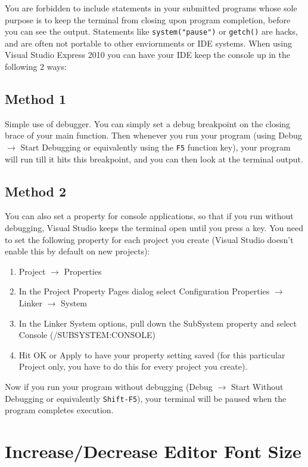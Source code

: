 \documentclass[11pt]{article}
\begin{document}
You are forbidden to include statements in your submitted programs
whose sole purpose is to keep the terminal from closing upon program
completion, before you can see the output.  Statements like
\verb~system("pause")~ or \verb~getch()~ are hacks, and are often not portable
to other enviornments or IDE systems.  When using Visual Studio Express 2010
you can have your IDE keep the console up in the following 2 ways:
\subsection{Method 1}
\label{sec-5-1}

Simple use of debugger.  You can simply set a debug breakpoint on the
closing brace of your main function.  Then whenever you run your
program (using Debug $\rightarrow$ Start Debugging or equivalently
using the \verb~F5~ function key), your program will run till it hits this
breakpoint, and you can then look at the terminal output.
\subsection{Method 2}
\label{sec-5-2}

You can also set a property for console applications, so that if you
run without debugging, Visual Studio keeps the terminal open until
you press a key.  You need to set the following property for each
project you create (Visual Studio doesn't enable this by default
on new projects):

\begin{enumerate}
\item Project $\rightarrow$ Properties
\item In the Project Property Pages dialog select Configuration Properties $\rightarrow$ Linker $\rightarrow$ System
\item In the Linker System options, pull down the SubSystem property and select Console (/SUBSYSTEM:CONSOLE)
\item Hit OK or Apply to have your property setting saved (for this particular Project only, you have to do this for every project you create).
\end{enumerate}

Now if you run your program without debugging (Debug $\rightarrow$ Start
Without Debugging or equivalently \verb~Shift-F5~), your terminal will be
paused when the program completes execution.
\section{Increase/Decrease Editor Font Size}
\label{sec-6}
\end{document}
